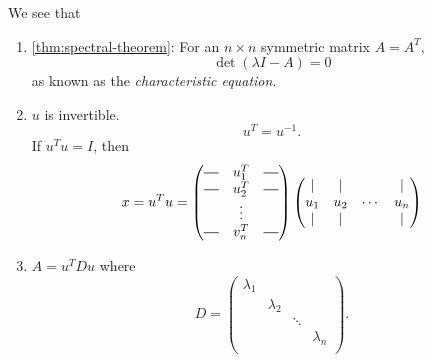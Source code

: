 \newcommand*{\horzbar}{\rule[.5ex]{2.5ex}{0.5pt}}
\begin{prev}
	We see that
	\begin{enumerate}
		\item \autoref{thm:spectral-theorem}: For an \(n\times n\) symmetric matrix \(A = A^{T}\),
		      \[
			      \det(\lambda I - A) = 0
		      \]
		      as known as the \emph{characteristic equation}.
		\item \(u\) is invertible.
		      \[
			      u^{T} = u^{-1}.
		      \]
		      If \(u^{T}u = I\), then
		      \[
			      x = u^{T}u = \begin{pmatrix}
				      \horzbar & u^{T}_1 & \horzbar \\
				      \horzbar & u^{T}_2 & \horzbar \\
				               & \vdots  &          \\
				      \horzbar & v^{T}_n & \horzbar \\
			      \end{pmatrix}\begin{pmatrix}
				      \mid & \mid &        & \mid \\
				      u_1  & u_2  & \cdots & u_n  \\
				      \mid & \mid &        & \mid \\
			      \end{pmatrix}
		      \]
		\item \(A = u^{T} D u\)  where \[
			      D  = \begin{pmatrix}
				      \lambda_1 &           &        &           \\
				                & \lambda_2 &        &           \\
				                &           & \ddots &           \\
				                &           &        & \lambda_n \\
			      \end{pmatrix}.
		      \]
	\end{enumerate}
\end{prev}

